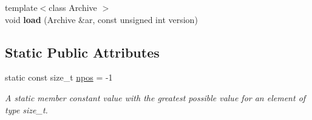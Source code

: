 \begin{CompactItemize}
\item 
\hypertarget{classdeque__string_87d72bf96205aa9ceeb15e4081f9feb6}{
{\footnotesize template$<$class Archive $>$ }\\void \textbf{load} (Archive \&ar, const unsigned int version)}
\label{classdeque__string_87d72bf96205aa9ceeb15e4081f9feb6}

\end{CompactItemize}
\subsection*{Static Public Attributes}
\begin{CompactItemize}
\item 
\hypertarget{classdeque__string_b2a5692bbdd473486ce93df0cadd2540}{
static const size\_\-t \hyperlink{classdeque__string_b2a5692bbdd473486ce93df0cadd2540}{npos} = -1}
\label{classdeque__string_b2a5692bbdd473486ce93df0cadd2540}

\begin{CompactList}\small\item\em A static member constant value with the greatest possible value for an element of type size\_\-t. \item\end{CompactList}\end{CompactItemize}
